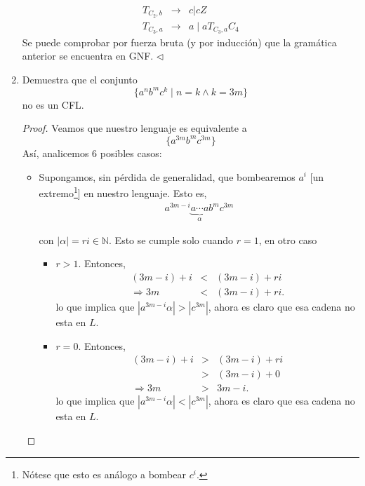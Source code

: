 \documentclass{article}
\begin{document}
\begin{enumerate}
\begin{eqnarray*}
      T_{C_2,b} &\rightarrow& c|cZ\\
      T_{C_3,a} &\rightarrow& a\; |\; a T_{C_3, a} C_4
    \end{eqnarray*}
    Se puede comprobar por fuerza bruta (y por inducción) que la gramática
    anterior se encuentra en GNF.
    \hfill $\lhd$
  \item Demuestra que el conjunto
    \[
    \{a^n b^m c^k\; |\; n = k \land k = 3m\}
    \]
    no es un CFL.
    \begin{proof}
      Veamos que nuestro lenguaje es equivalente a
      \[
       \{a^{3m} b^m c^{3m}\}
      \]
      Así, analicemos $6$ posibles casos:
      \newcommand{\localtextbulletone}{\textcolor{black}{\raisebox{.45ex}{\rule{.6ex}{.6ex}}}}
      \renewcommand{\labelitemi}{\localtextbulletone}
      \begin{itemize}
      \item Supongamos, sin pérdida de generalidad, que bombearemos $a^i$ [un extremo\footnote{Nótese que esto es análogo a bombear $c^i$.}]
        en nuestro lenguaje. Esto es,
        \begin{eqnarray*}
          a^{3m - i} \underbrace{a \dotsm a}_{\alpha} b^m c^{3m}
        \end{eqnarray*}
        
        \begin{center}
        \end{center}

        con $|\alpha| = ri \in \mathbb{N}$. Esto se cumple solo cuando $r = 1$, en otro caso
        \begin{itemize}
        \item $r > 1$. Entonces,
          \begin{eqnarray*}
            (3m - i) + i &<& (3m - i) + ri\\
            \Rightarrow 3m &<& (3m - i) + ri.
          \end{eqnarray*}
          lo que implica que $|a^{3m - i}\alpha| > |c^{3m}|$, ahora es claro que esa cadena no esta en $L$.
        \item $r = 0$. Entonces,
          \begin{eqnarray*}
            (3m - i) + i &>& (3m - i) + ri\\
            &>& (3m - i) + 0\\
            \Rightarrow 3m &>& 3m - i.
          \end{eqnarray*}
          lo que implica que $|a^{3m - i}\alpha| < |c^{3m}|$, ahora es claro que esa cadena no esta en $L$.
        \end{itemize}
        

\end{itemize}
\end{proof}
\end{enumerate}
\end{document}
